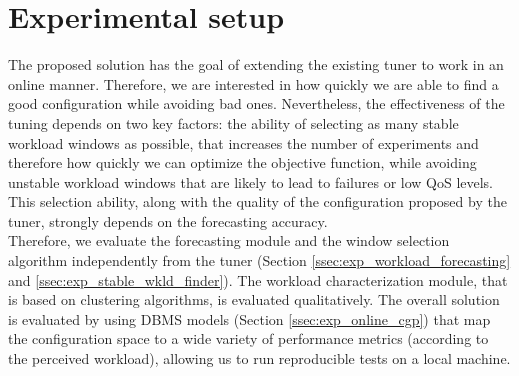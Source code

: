 \documentclass[a4paper, 12pt]{article} %
\begin{document}
	\section{Experimental setup } \label{sec:exp_setup}
	The proposed solution has the goal of extending the existing tuner \cite{AkamasCGP} to work in an online manner. Therefore, we are interested in how quickly we are able to find a good configuration while avoiding bad ones. Nevertheless, the effectiveness of the tuning depends on two key factors: the ability of selecting as many stable workload windows as possible, that increases the number of experiments and therefore how quickly we can optimize the objective function, while avoiding unstable workload windows that are likely to lead to failures or low QoS levels. This selection ability,  along with the quality of the configuration proposed by the tuner, strongly depends on the forecasting accuracy.\\
	Therefore, we evaluate the forecasting module and the window selection algorithm independently from the tuner (Section \ref{ssec:exp_workload_forecasting} and \ref{ssec:exp_stable_wkld_finder}). The workload characterization module, that is based on clustering algorithms, is evaluated qualitatively. The overall solution is evaluated by using DBMS models (Section \ref{ssec:exp_online_cgp}) that map the configuration space to a wide variety of performance metrics (according to the perceived workload), allowing us to run reproducible tests on a local machine.
	
\end{document}
